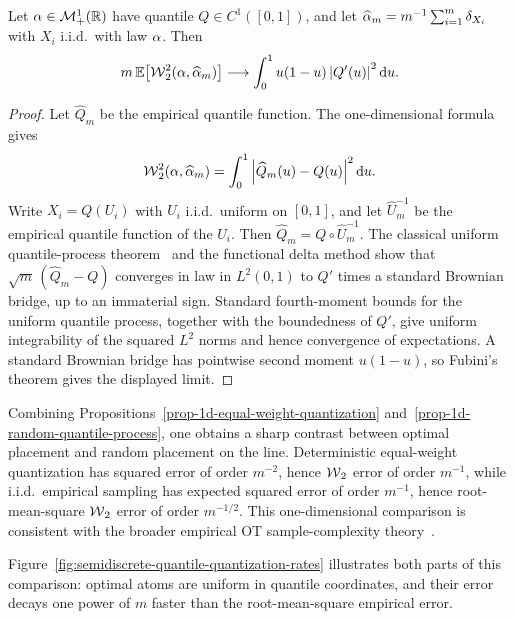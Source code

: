 \begin{prop}\label{prop-1d-random-quantile-process}
	Let $\alpha\in\mathcal{M}_+^1(\mathbb{R})$ have quantile $Q\in C^1([0,1])$, and let $\widehat{\alpha}_m=m^{-1}\sum_{i=1}^m\delta_{X_i}$ with $X_i$ i.i.d.\ with law $\alpha$. Then
	\[
		m\,\mathbb{E}\!\left[\operatorname{\mathcal{W}}_2^2(\alpha,\widehat{\alpha}_m)\right]
		\longrightarrow
		\int_0^1 u(1-u)\left\lvert Q'(u)\right\rvert^2\mathrm{d} u.
	\]
\end{prop}
\begin{proof}
	Let $\widehat Q_m$ be the empirical quantile function. The one-dimensional formula gives
	\[
		\operatorname{\mathcal{W}}_2^2(\alpha,\widehat{\alpha}_m)
		=
		\int_0^1\left\lvert\widehat Q_m(u)-Q(u)\right\rvert^2\mathrm{d} u.
	\]
	Write $X_i=Q(U_i)$ with $U_i$ i.i.d.\ uniform on $[0,1]$, and let $\widehat U_m^{-1}$ be the empirical quantile function of the $U_i$. Then $\widehat Q_m=Q\circ \widehat U_m^{-1}$. The classical uniform quantile-process theorem~\cite{vanDerVaartWellner1996,BobkovLedoux2019EmpiricalKantorovich} and the functional delta method show that $\sqrt m\,(\widehat Q_m-Q)$ converges in law in $L^2(0,1)$ to $Q'$ times a standard Brownian bridge, up to an immaterial sign. Standard fourth-moment bounds for the uniform quantile process, together with the boundedness of $Q'$, give uniform integrability of the squared $L^2$ norms and hence convergence of expectations. A standard Brownian bridge has pointwise second moment $u(1-u)$, so Fubini's theorem gives the displayed limit.
\end{proof}

Combining Propositions~\ref{prop-1d-equal-weight-quantization} and~\ref{prop-1d-random-quantile-process}, one obtains a sharp contrast between optimal placement and random placement on the line. Deterministic equal-weight quantization has squared error of order $m^{-2}$, hence $\operatorname{\mathcal{W}}_2$ error of order $m^{-1}$, while i.i.d.\ empirical sampling has expected squared error of order $m^{-1}$, hence root-mean-square $\operatorname{\mathcal{W}}_2$ error of order $m^{-1/2}$. This one-dimensional comparison is consistent with the broader empirical OT sample-complexity theory~\cite{dereich2013constructive,fournier2015rate,weed2017sharp}.

Figure~\ref{fig:semidiscrete-quantile-quantization-rates} illustrates both parts of this comparison: optimal atoms are uniform in quantile coordinates, and their error decays one power of $m$ faster than the root-mean-square empirical error.

